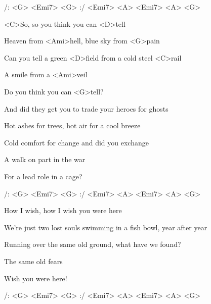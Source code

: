 
/: <G> <Emi7> <G> :/ <Emi7> <A> <Emi7> <A> <G>

\zs
<C>So, so you think you can <D>tell

Heaven from <Ami>hell, blue sky from <G>pain

Can you tell a green <D>field from a cold steel <C>rail

A smile from a <Ami>veil

Do you think you can <G>tell?
\ks

\zs
And did they get you to trade your heroes for ghosts

Hot ashes for trees, hot air for a cool breeze

Cold comfort for change
and did you exchange

A walk on part in the war

For a lead role in a cage?
\ks

/: <G> <Emi7> <G> :/ <Emi7> <A> <Emi7> <A> <G>

\zs
How I wish, how I wish you were here

We're just two lost souls swimming in a fish bowl, year after year

Running over the same old ground, what have we found?

The same old fears

Wish you were here!
\ks

/: <G> <Emi7> <G> :/ <Emi7> <A> <Emi7> <A> <G>

\kp
